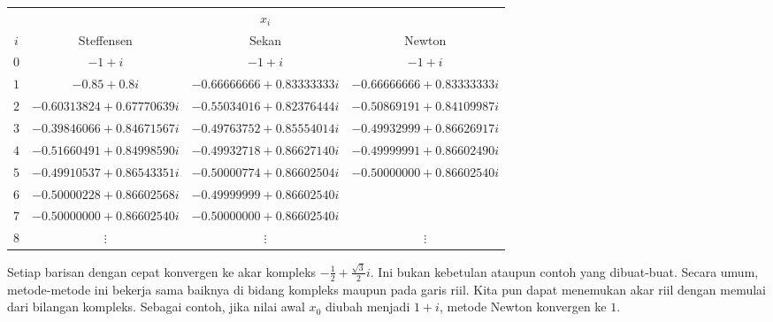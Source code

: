 \begin{center}
\begin{tabular}{c|ccc}
 & \multicolumn{3}{c}{$x_{i}$}\tabularnewline
\cline{2-4}
$i$ & Steffensen & Sekan & Newton\tabularnewline
\hline 
$0$ & $-1+i$ & $-1+i$ & $-1+i$\tabularnewline
$1$ & $-0.85+0.8i$ & $-0.66666666+0.83333333i$ & $-0.66666666+0.83333333i$\tabularnewline
$2$ & $-0.60313824+0.67770639i$ & $-0.55034016+0.82376444i$ & $-0.50869191+0.84109987i$\tabularnewline
$3$ & $-0.39846066+0.84671567i$ & $-0.49763752+0.85554014i$ & $-0.49932999+0.86626917i$\tabularnewline
$4$ & $-0.51660491+0.84998590i$ & $-0.49932718+0.86627140i$ & $-0.49999991+0.86602490i$\tabularnewline
$5$ & $-0.49910537+0.86543351i$ & $-0.50000774+0.86602504i$ & $-0.50000000+0.86602540i$\tabularnewline
$6$ & $-0.50000228+0.86602568i$ & $-0.49999999+0.86602540i$ & \tabularnewline
$7$ & $-0.50000000+0.86602540i$ & $-0.50000000+0.86602540i$ & \tabularnewline
$8$ & $\vdots$ & $\vdots$ & $\vdots$\tabularnewline
\end{tabular}
\par\end{center}

\noindent Setiap barisan dengan cepat konvergen ke akar kompleks $-\frac{1}{2}+\frac{\sqrt{3}}{2}i$.
Ini bukan kebetulan ataupun contoh yang dibuat-buat. Secara umum,
metode-metode ini bekerja sama baiknya di bidang kompleks maupun pada
garis riil. Kita pun dapat menemukan akar riil dengan memulai dari
bilangan kompleks. Sebagai contoh, jika nilai awal $x_{0}$ diubah
menjadi $1+i$, metode Newton konvergen ke $1$.

